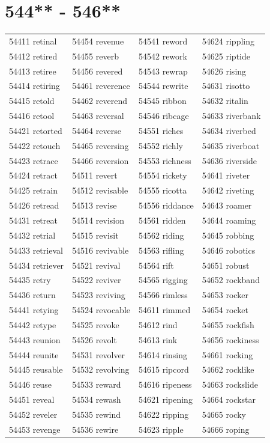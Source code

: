 \documentclass[10pt, oneside]{book}
\begin{document}
\begin{table}
	\centering
	\section*{544** - 546**}
	\begin{tabular}{l l l l}
54411 retinal &54454 revenue &54541 reword &54624 rippling\\
54412 retired &54455 reverb &54542 rework &54625 riptide\\
54413 retiree &54456 revered &54543 rewrap &54626 rising\\
54414 retiring &54461 reverence &54544 rewrite &54631 risotto\\
54415 retold &54462 reverend &54545 ribbon &54632 ritalin\\
54416 retool &54463 reversal &54546 ribcage &54633 riverbank\\
54421 retorted &54464 reverse &54551 riches &54634 riverbed\\
54422 retouch &54465 reversing &54552 richly &54635 riverboat\\
54423 retrace &54466 reversion &54553 richness &54636 riverside\\
54424 retract &54511 revert &54554 rickety &54641 riveter\\
54425 retrain &54512 revisable &54555 ricotta &54642 riveting\\
54426 retread &54513 revise &54556 riddance &54643 roamer\\
54431 retreat &54514 revision &54561 ridden &54644 roaming\\
54432 retrial &54515 revisit &54562 riding &54645 robbing\\
54433 retrieval &54516 revivable &54563 rifling &54646 robotics\\
54434 retriever &54521 revival &54564 rift &54651 robust\\
54435 retry &54522 reviver &54565 rigging &54652 rockband\\
54436 return &54523 reviving &54566 rimless &54653 rocker\\
54441 retying &54524 revocable &54611 rimmed &54654 rocket\\
54442 retype &54525 revoke &54612 rind &54655 rockfish\\
54443 reunion &54526 revolt &54613 rink &54656 rockiness\\
54444 reunite &54531 revolver &54614 rinsing &54661 rocking\\
54445 reusable &54532 revolving &54615 ripcord &54662 rocklike\\
54446 reuse &54533 reward &54616 ripeness &54663 rockslide\\
54451 reveal &54534 rewash &54621 ripening &54664 rockstar\\
54452 reveler &54535 rewind &54622 ripping &54665 rocky\\
54453 revenge &54536 rewire &54623 ripple &54666 roping\\
	\end{tabular}
 \end{table}
\clearpage
\end{document}
